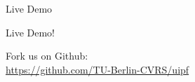 \documentclass{beamer}
\newcommand{\beginbackup}{
   \newcounter{framenumbervorappendix}
   \setcounter{framenumbervorappendix}{\value{framenumber}}
}
\newcommand{\backupend}{
   \addtocounter{framenumbervorappendix}{-\value{framenumber}}
   \addtocounter{framenumber}{\value{framenumbervorappendix}}
}
\begin{document}
\begin{frame}{Live Demo}

\begin{center}
	{\Huge
	Live Demo!}
	\vspace{2cm}

	Fork us on Github:\\\vspace{0.2cm}
	\url{https://github.com/TU-Berlin-CVRS/uipf}

\end{center}
\end{frame}




\end{document}
